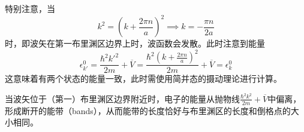 特别注意，当
\begin{equation}
    k^2 = (k + \frac{2\pi n}{a})^2 \implies k = - \frac{\pi n}{2a}
\end{equation}
时，即波矢在第一布里渊区边界上时，波函数会发散。此时注意到能量
\begin{equation}
    \epsilon_{k'}^0 = \frac{\hbar^2 k'^2}{2m} + \overline V = \frac{\hbar^2 (k + \frac{2\pi n}{a})^2}{2m} + \overline V = \epsilon_k^0
\end{equation}
这意味着有两个状态的能量一致，此时需使用简并态的摄动理论进行计算。

\begin{proposition}
    当波矢位于（第一）布里渊区边界附近时，电子的能量从抛物线$\frac{\hbar^2 k^2}{2m} + \overline V$中偏离，形成断开的能带（bands），从而能带的长度恰好与布里渊区的长度和倒格点的大小相同。
\end{proposition}


